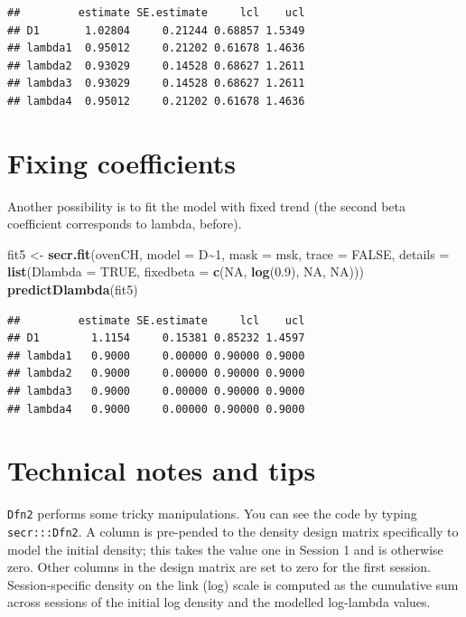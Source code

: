 \documentclass[
]{book}
\newenvironment{Shaded}{\begin{snugshade}}{\end{snugshade}}
\newcommand{\AttributeTok}[1]{\textcolor[rgb]{0.13,0.29,0.53}{#1}}
\newcommand{\ConstantTok}[1]{\textcolor[rgb]{0.56,0.35,0.01}{#1}}
\newcommand{\DecValTok}[1]{\textcolor[rgb]{0.00,0.00,0.81}{#1}}
\newcommand{\FloatTok}[1]{\textcolor[rgb]{0.00,0.00,0.81}{#1}}
\newcommand{\FunctionTok}[1]{\textcolor[rgb]{0.13,0.29,0.53}{\textbf{#1}}}
\newcommand{\NormalTok}[1]{#1}
\newcommand{\OtherTok}[1]{\textcolor[rgb]{0.56,0.35,0.01}{#1}}
\newcommand{\SpecialCharTok}[1]{\textcolor[rgb]{0.81,0.36,0.00}{\textbf{#1}}}
\begin{document}
\begin{verbatim}
##         estimate SE.estimate     lcl    ucl
## D1       1.02804     0.21244 0.68857 1.5349
## lambda1  0.95012     0.21202 0.61678 1.4636
## lambda2  0.93029     0.14528 0.68627 1.2611
## lambda3  0.93029     0.14528 0.68627 1.2611
## lambda4  0.95012     0.21202 0.61678 1.4636
\end{verbatim}

\section{Fixing coefficients}\label{fixing-coefficients-1}

Another possibility is to fit the model with fixed trend (the second beta coefficient corresponds to lambda, before).

\begin{Shaded}
\begin{Highlighting}[]
\NormalTok{ fit5 }\OtherTok{\textless{}{-}} \FunctionTok{secr.fit}\NormalTok{(ovenCH, }\AttributeTok{model =}\NormalTok{ D}\SpecialCharTok{\textasciitilde{}}\DecValTok{1}\NormalTok{, }\AttributeTok{mask =}\NormalTok{ msk, }\AttributeTok{trace =} \ConstantTok{FALSE}\NormalTok{,}
    \AttributeTok{details =} \FunctionTok{list}\NormalTok{(}\AttributeTok{Dlambda =} \ConstantTok{TRUE}\NormalTok{, }\AttributeTok{fixedbeta =} 
    \FunctionTok{c}\NormalTok{(}\ConstantTok{NA}\NormalTok{, }\FunctionTok{log}\NormalTok{(}\FloatTok{0.9}\NormalTok{), }\ConstantTok{NA}\NormalTok{, }\ConstantTok{NA}\NormalTok{)))}
 \FunctionTok{predictDlambda}\NormalTok{(fit5)}
\end{Highlighting}
\end{Shaded}

\begin{verbatim}
##         estimate SE.estimate     lcl    ucl
## D1        1.1154     0.15381 0.85232 1.4597
## lambda1   0.9000     0.00000 0.90000 0.9000
## lambda2   0.9000     0.00000 0.90000 0.9000
## lambda3   0.9000     0.00000 0.90000 0.9000
## lambda4   0.9000     0.00000 0.90000 0.9000
\end{verbatim}

\section{Technical notes and tips}\label{Review}

\texttt{Dfn2} performs some tricky manipulations. You can see the code by typing \texttt{secr:::Dfn2}. A column is pre-pended to the density design matrix specifically to model the initial density; this takes the value one in Session 1 and is otherwise zero. Other columns in the design matrix are set to zero for the first session. Session-specific density on the link (log) scale is computed as the cumulative sum across sessions of the initial log density and the modelled log-lambda values.
\end{document}
